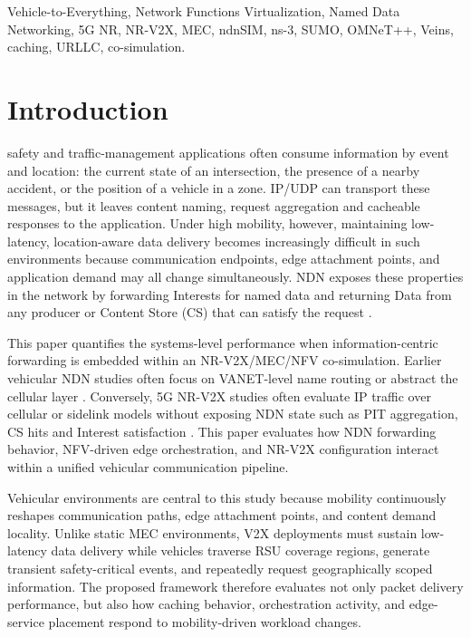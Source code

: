 \documentclass[journal]{IEEEtran}
\begin{document}
\begin{IEEEkeywords}
Vehicle-to-Everything, Network Functions Virtualization, Named Data Networking, 5G NR, NR-V2X, MEC, ndnSIM, ns-3, SUMO, OMNeT++, Veins, caching, URLLC, co-simulation.
\end{IEEEkeywords}

\section{Introduction}
\label{sec:intro}

 safety and traffic-management applications often consume information by event and location: the current state of an intersection, the presence of a nearby accident, or the position of a vehicle in a zone. IP/UDP can transport these messages, but it leaves content naming, request aggregation and cacheable responses to the application. Under high mobility, however, maintaining low-latency, location-aware data delivery becomes increasingly difficult in such environments because communication endpoints, edge attachment points, and application demand may all change simultaneously. NDN exposes these properties in the network by forwarding Interests for named data and returning Data from any producer or Content Store (CS) that can satisfy the request \cite{ref:ndn-overview,ref:nfd}.

This paper quantifies the systems-level performance when information-centric forwarding is embedded within an NR-V2X/MEC/NFV co-simulation. Earlier vehicular NDN studies often focus on VANET-level name routing or abstract the cellular layer \cite{ref:vndn,ref:ndn-v2x-survey}. Conversely, 5G NR-V2X studies often evaluate IP traffic over cellular or sidelink models without exposing NDN state such as PIT aggregation, CS hits and Interest satisfaction \cite{ref:cv2x-rel16,ref:ns3-nr}. This paper evaluates how NDN forwarding behavior, NFV-driven edge orchestration, and NR-V2X configuration interact within a unified vehicular communication pipeline.

Vehicular environments are central to this study because mobility continuously reshapes communication paths, edge attachment points, and content demand locality. Unlike static MEC environments, V2X deployments must sustain low-latency data delivery while vehicles traverse RSU coverage regions, generate transient safety-critical events, and repeatedly request geographically scoped information. The proposed framework therefore evaluates not only packet delivery performance, but also how caching behavior, orchestration activity, and edge-service placement respond to mobility-driven workload changes.
\end{document}
